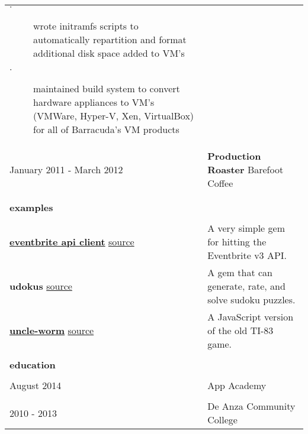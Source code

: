 \documentclass{article}
\begin{document}
\begin{tabular}{L{3cm} R{13.50cm}}
    \begin{description}
        \item[$\cdot$] wrote initramfs scripts to automatically repartition and 
            format additional disk space added to VM's
        \item[$\cdot$] maintained build system to convert hardware appliances to VM's
            (VMWare, Hyper-V, Xen, VirtualBox) for all of Barracuda's VM products
    \end{description}

    \\
    
    January 2011 - March 2012
    &
    \textbf{Production Roaster}
    Barefoot Coffee
    
    \\\\ \hline \\

    \large{\textbf{examples}} \\\\
    \normalsize
    
    \href{https://rubygems.org/gems/eventbrite_api_client}{\large{\textbf{eventbrite api client}}}
    \newline
    \normalsize
    \href{https://github.com/kellyjospehprice/eventbrite_api_client}{source}
    
    &
    
    A very simple gem for hitting the Eventbrite v3 API. 

    \\
    
    {\large{\textbf{udokus}}}
    \newline
    \normalsize
    \href{https://github.com/kellyjospehprice/udokus}{source}
    
    &
    
    A gem that can generate, rate, and solve sudoku puzzles.

    \\
    
    \href{http://uncle-worm.herokuapp.com}{\large{\textbf{uncle-worm}}}
    \newline
    \normalsize
    \href{https://github.com/kellyjospehprice/uncle_worm}{source}
    
    &
    
    A JavaScript version of the old TI-83 game. 
    
    \\ \hline \\

    \large{\textbf{education}} \\\\
    \normalsize

    August 2014 & App Academy \\

    \\

    2010 - 2013 & De Anza Community College \\
\end{tabular}
\end{document}
